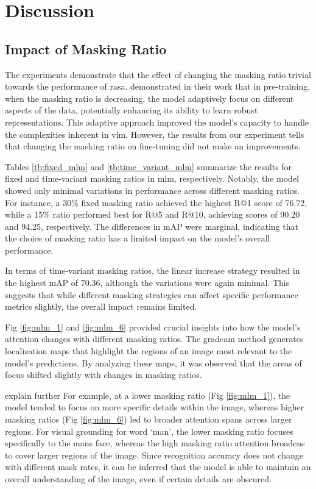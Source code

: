 \section{Discussion}
\subsection{Impact of Masking Ratio}

The experiments demonstrate that the effect of changing the masking ratio trivial towards the performance of \acrshort{rasa}. \cite{yang2023learningbettermaskingbetter} demonstrated in their work that in pre-training, when the masking ratio is decreasing, the model adaptively focus on different aspects of the data, potentially enhancing its ability to learn robust representations. This adaptive approach improved the model's capacity to handle the complexities inherent in \acrshort{vlm}. However, the results from our experiment tells that changing the masking ratio on fine-tuning did not make an improvements. 

Tables \ref{tb:fixed_mlm} and \ref{tb:time_variant_mlm} summarize the results for fixed and time-variant masking ratios in \acrshort{mlm}, respectively. Notably, the model showed only minimal variations in performance across different masking ratios. For instance, a 30\% fixed masking ratio achieved the highest R@1 score of 76.72, while a 15\% ratio performed best for R@5 and R@10, achieving scores of 90.20 and 94.25, respectively. The differences in mAP were marginal, indicating that the choice of masking ratio has a limited impact on the model's overall performance.

In terms of time-variant masking ratios, the linear increase strategy resulted in the highest mAP of 70.36, although the variations were again minimal. This suggests that while different masking strategies can affect specific performance metrics slightly, the overall impact remains limited.

Fig \ref{fig:mlm_1} and \ref{fig:mlm_6} provided crucial insights into how the model's attention changes with different masking ratios. The \acrshort{gradcam} method generates localization maps that highlight the regions of an image most relevant to the model's predictions. By analyzing these maps, it was observed that the areas of focus shifted slightly with changes in masking ratios.

{\color{red} explain further}
For example, at a lower masking ratio (Fig \ref{fig:mlm_1}), the model tended to focus on more specific details within the image, whereas higher masking ratios (Fig \ref{fig:mlm_6}) led to broader attention spans across larger regions. For visual grounding for word `man', the lower masking ratio focuses specifically to the mans face, whereas the high masking ratio attention broadens to cover larger regions of the image. Since recognition accuracy does not change with different mask rates, it can be inferred that the model is able to maintain an overall understanding of the image, even if certain details are obscured.  


